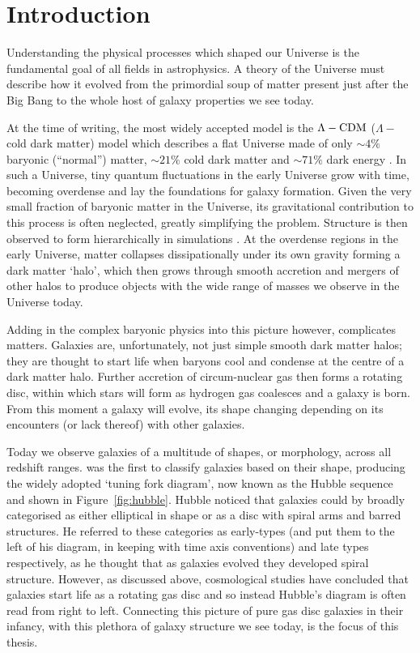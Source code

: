 \chapter{Introduction}\label{chap:intro}

Understanding the physical processes which shaped our Universe is the fundamental goal of all fields in astrophysics. A theory of the Universe must describe how it evolved from the primordial soup of matter present just after the Big Bang to the whole host of galaxy properties we see today. 

At the time of writing, the most widely accepted model is the $\Lambda-\rm{CDM}$ ($\Lambda-$ cold dark matter) model which describes a flat Universe made of only $\sim4\%$ baryonic (``normal'') matter, $\sim21\%$ cold dark matter and $\sim71\%$ dark energy \citep{planck16}. In such a Universe, tiny quantum fluctuations in the early Universe grow with time, becoming overdense and lay the foundations for galaxy formation. Given the very small fraction of baryonic matter in the Universe, its gravitational contribution to this process is often neglected, greatly simplifying the problem. Structure is then observed to form hierarchically in simulations \citep{citebomb}. At the overdense regions in the early Universe, matter collapses dissipationally under its own gravity forming a dark matter `halo', which then grows through smooth accretion and mergers of other halos to produce objects with the wide range of masses we observe in the Universe today. 

Adding in the complex baryonic physics into this picture however, complicates matters. Galaxies are, unfortunately, not just simple smooth dark matter halos; they are thought to start life when baryons cool and condense at the centre of a dark matter halo. Further accretion of circum-nuclear gas then forms a rotating disc, within which stars will form as hydrogen gas coalesces and a galaxy is born. From this moment a galaxy will evolve, its shape changing depending on its encounters (or lack thereof) with other galaxies. 

Today we observe galaxies of a multitude of shapes, or morphology, across all redshift ranges. \cite{hubble36}  was the first to classify galaxies based on their shape, producing the widely adopted `tuning fork diagram', now known as the Hubble sequence and shown in Figure~\ref{fig:hubble}. Hubble noticed that galaxies could by broadly categorised as either elliptical in shape or as a disc with spiral arms and barred structures. He referred to these categories as early-types (and put them to the left of his diagram, in keeping with time axis conventions) and late types respectively, as he thought that as galaxies evolved they developed spiral structure. However, as discussed above, cosmological studies have concluded that galaxies start life as a rotating gas disc and so instead Hubble's diagram is often read from right to left. Connecting this picture of pure gas disc galaxies in their infancy, with this plethora of galaxy structure we see today, is the focus of this thesis. 

